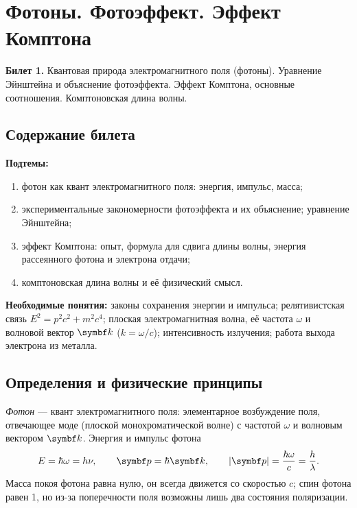 \chapter[Фотоны. Фотоэффект. Эффект Комптона]{Фотоны. Фотоэффект. Эффект Комптона}
\label{t:01}

\begin{qbox}
\textbf{Билет 1.} Квантовая природа электромагнитного поля (фотоны). Уравнение Эйнштейна
и объяснение фотоэффекта. Эффект Комптона, основные соотношения. Комптоновская длина волны.
\end{qbox}

\section{Содержание билета}

\textbf{Подтемы:}
\begin{enumerate}
  \item фотон как квант электромагнитного поля: энергия, импульс, масса;
  \item экспериментальные закономерности фотоэффекта и их объяснение; уравнение Эйнштейна;
  \item эффект Комптона: опыт, формула для сдвига длины волны, энергия рассеянного фотона и электрона отдачи;
  \item комптоновская длина волны и её физический смысл.
\end{enumerate}

\textbf{Необходимые понятия:} законы сохранения энергии и импульса; релятивистская связь
$E^2=p^2c^2+m^2c^4$; плоская электромагнитная волна, её частота $\omega$ и волновой вектор
$\vect k$ ($k=\omega/c$); интенсивность излучения; работа выхода электрона из металла.

\section{Определения и физические принципы}

\begin{definition}[фотон]
\emph{Фотон} — квант электромагнитного поля: элементарное возбуждение поля, отвечающее
моде (плоской монохроматической волне) с частотой $\omega$ и волновым вектором $\vect k$.
Энергия и импульс фотона
\begin{equation}\label{eq:1:photon}
  E=\hbar\omega=h\nu,\qquad \vect p=\hbar\vect k,\qquad |\vect p|=\frac{\hbar\omega}{c}=\frac{h}{\lambda}.
\end{equation}
Масса покоя фотона равна нулю, он всегда движется со скоростью $c$; спин фотона равен 1,
но из-за поперечности поля возможны лишь два состояния поляризации.
\end{definition}

